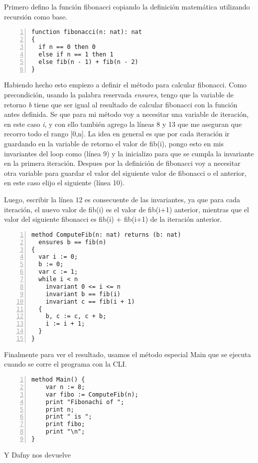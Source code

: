 \documentclass[runningheads]{llncs}
\begin{document}
Primero defino la función fibonacci copiando la definición matemática utilizando recursión como base.

\begin{Verbatim}[numbers=left,xleftmargin=5mm]
function fibonacci(n: nat): nat
{
  if n == 0 then 0
  else if n == 1 then 1
  else fib(n - 1) + fib(n - 2)
}
\end{Verbatim}

Habiendo hecho esto empiezo a definir el método para calcular fibonacci.
Como precondición, usando la palabra reservada \textit{ensures}, tengo que la variable de retorno \textit{b} tiene que ser igual al resultado de calcular fibonacci con la función antes definida.
Se que para mi método voy a necesitar una variable de iteración, en este caso \textit{i}, y con ello también agrego la líneas 8 y 13 que me aseguran que recorro todo el rango [0,n].
La idea en general es que por cada iteración ir guardando en la variable de retorno el valor de fib(i), pongo esto en mis invariantes del loop como (línea 9) 
y la inicializo para que se cumpla la invariante en la primera iteración. Despues por la definición de fibonacci voy a necesitar otra variable para guardar el valor del siguiente valor de 
fibonacci o el anterior, en este caso elijo el siguiente (línea 10).

Luego, escribir la línea 12 es consecuente de las invariantes, ya que para cada iteración, el nuevo valor de fib(i) es el valor de fib(i+1) anterior, mientras que  
el valor del siguiente fibonacci es fib(i) + fib(i+1) de la iteración anterior.

\begin{Verbatim}[numbers=left,xleftmargin=5mm]
method ComputeFib(n: nat) returns (b: nat)
  ensures b == fib(n)
{
  var i := 0;
  b := 0;
  var c := 1;
  while i < n
    invariant 0 <= i <= n
    invariant b == fib(i)
    invariant c == fib(i + 1)
  {
    b, c := c, c + b;
    i := i + 1;
  }
}
\end{Verbatim}

Finalmente para ver el resultado, usamos el método especial Main que se ejecuta cuando se corre el programa con la CLI.

\begin{Verbatim}[numbers=left,xleftmargin=5mm]
method Main() {
    var n := 8;
    var fibo := ComputeFib(n);
    print "Fibonachi of ";
    print n;
    print " is ";
    print fibo;
    print "\n";
}
\end{Verbatim}

Y Dafny nos devuelve 
\end{document}
